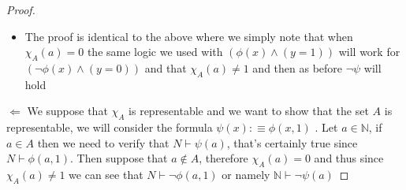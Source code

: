 \begin{proof}
\begin{enumerate}
\begin{itemize}
            \item The proof is identical to the above where we simply note that
            when \( \chi _{ A } \left( a \right) = 0   \) the same logic we
            used with \( \left( \phi \left( x \right) \land \left( y = 1 \right)
            \right)  \) will work for \( \left( \neg \phi \left( x \right) \land
            \left( y = 0 \right) \right)  \) and that \( \chi _{ A } \left( a
        \right) \neq 1 \) and then as before \( \neg \psi  \) will hold
        \end{itemize}
    \end{enumerate}
    \( \Leftarrow  \) We suppose that \( \chi _{ A }  \) is representable and we
    want to show that the set \( A \) is representable, we will consider the
    formula \( \psi \left( x \right)  :\equiv \phi \left( x, 1 \right)  \) .
    Let \( a \in \mathbb{N}  \), if \( a \in A \) then we need to verify that \(
    N \vdash \psi \left( a \right) \), that's certainly true since \( N \vdash
    \phi \left( a, 1 \right)  \). Then suppose that \( a \not\in  A \),
    therefore \( \chi _{ A } \left( a  \right) = 0 \) and thus since \( \chi _{
    A} \left( a \right) \neq 1 \) we can see that \( N \vdash  \neg \phi \left(
    a, 1\right)  \) or namely \( \mathbb{N} \vdash \neg \psi \left( a \right)   \) 
\end{proof}

